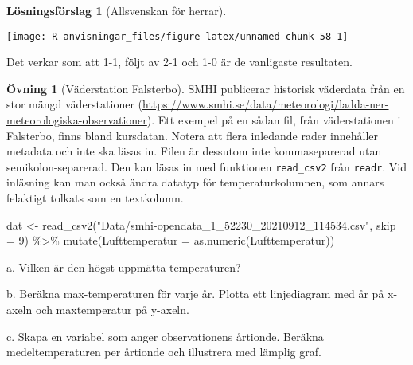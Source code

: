 \documentclass[
]{book}
\newenvironment{Shaded}{\begin{snugshade}}{\end{snugshade}}
\newcommand{\AttributeTok}[1]{\textcolor[rgb]{0.77,0.63,0.00}{#1}}
\newcommand{\DecValTok}[1]{\textcolor[rgb]{0.00,0.00,0.81}{#1}}
\newcommand{\FunctionTok}[1]{\textcolor[rgb]{0.00,0.00,0.00}{#1}}
\newcommand{\NormalTok}[1]{#1}
\newcommand{\OtherTok}[1]{\textcolor[rgb]{0.56,0.35,0.01}{#1}}
\newcommand{\SpecialCharTok}[1]{\textcolor[rgb]{0.00,0.00,0.00}{#1}}
\newcommand{\StringTok}[1]{\textcolor[rgb]{0.31,0.60,0.02}{#1}}
\theoremstyle{definition}
\theoremstyle{definition}
\theoremstyle{definition}
\newtheorem{exercise}{Övning}[chapter]
\theoremstyle{definition}
\newtheorem{hypothesis}{Lösningsförslag}[chapter]
\theoremstyle{remark}
\begin{document}
\begin{hypothesis}[Allsvenskan för herrar]
\begin{center}\texttt{[image: R-anvisningar\_files/figure-latex/unnamed-chunk-58-1]} \end{center}

Det verkar som att 1-1, följt av 2-1 och 1-0 är de vanligaste resultaten.
\end{hypothesis}

\begin{exercise}[Väderstation Falsterbo]
SMHI publicerar historisk väderdata från en stor mängd väderstationer (\url{https://www.smhi.se/data/meteorologi/ladda-ner-meteorologiska-observationer}). Ett exempel på en sådan fil, från väderstationen i Falsterbo, finns bland kursdatan. Notera att flera inledande rader innehåller metadata och inte ska läsas in. Filen är dessutom inte kommaseparerad utan semikolon-separerad. Den kan läsas in med funktionen \texttt{read\_csv2} från \texttt{readr}. Vid inläsning kan man också ändra datatyp för temperaturkolumnen, som annars felaktigt tolkats som en textkolumn.

\begin{Shaded}
\begin{Highlighting}[]
\NormalTok{dat }\OtherTok{\textless{}{-}} \FunctionTok{read\_csv2}\NormalTok{(}\StringTok{"Data/smhi{-}opendata\_1\_52230\_20210912\_114534.csv"}\NormalTok{, }\AttributeTok{skip =} \DecValTok{9}\NormalTok{) }\SpecialCharTok{\%\textgreater{}\%} 
  \FunctionTok{mutate}\NormalTok{(}\AttributeTok{Lufttemperatur =} \FunctionTok{as.numeric}\NormalTok{(Lufttemperatur))}
\end{Highlighting}
\end{Shaded}

a. Vilken är den högst uppmätta temperaturen?

b. Beräkna max-temperaturen för varje år. Plotta ett linjediagram med år på x-axeln och maxtemperatur på y-axeln.

c. Skapa en variabel som anger observationens årtionde. Beräkna medeltemperaturen per årtionde och illustrera med lämplig graf.
\end{exercise}
\end{document}
